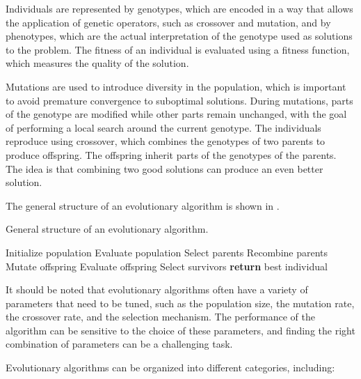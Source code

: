 Individuals are represented by genotypes, which are encoded in a way that allows the application of genetic operators, such as crossover and mutation, and
by phenotypes, which are the actual interpretation of the genotype used as solutions to the problem. The fitness of an individual is evaluated using a
fitness function, which measures the quality of the solution.

Mutations are used to introduce diversity in the population, which is important to avoid premature convergence to suboptimal solutions. During mutations,
parts of the genotype are modified while other parts remain unchanged, with the goal of performing a local search around the current genotype.
The individuals reproduce using crossover, which combines the genotypes of two parents to produce offspring. The offspring inherit parts of the genotypes
of the parents. The idea is that combining two good solutions can produce an even better solution.

The general structure of an evolutionary algorithm is shown in .

\begin{algorithm}[H]
    \caption{General structure of an evolutionary algorithm.}
    \label{alg:ea}
    \begin{algorithmic}
        \State Initialize population
        \State Evaluate population
            \State Select parents
            \State Recombine parents
            \State Mutate offspring
            \State Evaluate offspring
            \State Select survivors
        \EndWhile
        \State \textbf{return} best individual
    \end{algorithmic}
\end{algorithm}

It should be noted that evolutionary algorithms often have a variety of parameters that need to be tuned, such as the population size, the mutation rate,
the crossover rate, and the selection mechanism. The performance of the algorithm can be sensitive to the choice of these parameters, and finding the
right combination of parameters can be a challenging task.

Evolutionary algorithms can be organized into different categories, including:

